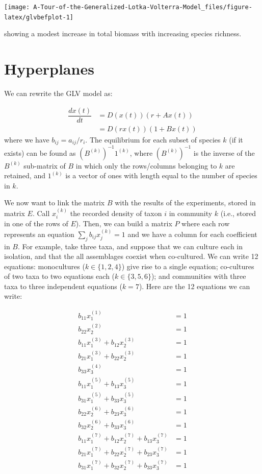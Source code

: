 \documentclass[]{book}
\begin{document}
\begin{center}\texttt{[image: A-Tour-of-the-Generalized-Lotka-Volterra-Model\_files/figure-latex/glvbefplot-1]} \end{center}

showing a modest increase in total biomass with increasing species richness.

\hypertarget{hyperplanes}{%
\section{Hyperplanes}\label{hyperplanes}}

We can rewrite the GLV model as:

\[
\begin{aligned}
\dfrac{dx(t)}{dt} &= D(x(t))(r + A x(t))\\
&= D(r x(t))(1 + B x(t))
\end{aligned}
\]
where we have \(b_{ij} = a_{ij} / r_i\). The equilibrium for each subset of species \(k\) (if it exists) can be found as \((B^{(k)})^{-1} 1^{(k)}\), where \((B^{(k)})^{-1}\) is the inverse of the \(B^{(k)}\) sub-matrix of \(B\) in which only the rows/columns belonging to \(k\) are retained, and \(1^{(k)}\) is a vector of ones with length equal to the number of species in \(k\).

We now want to link the matrix \(B\) with the results of the experiments, stored in matrix \(E\). Call \(x^{(k)}_i\) the recorded density of taxon \(i\) in community \(k\) (i.e., stored in one of the rows of \(E\)). Then, we can build a matrix \(P\) where each row represents an equation \(\sum_j b_{ij} x_j^{(k)} = 1\) and we have a column for each coefficient in \(B\). For example, take three taxa, and suppose that we can culture each in isolation, and that the all assemblages coexist when co-cultured. We can write 12 equations: monocultures (\(k \in \{1, 2, 4\}\)) give rise to a single equation; co-cultures of two taxa to two equations each (\(k \in \{3, 5, 6 \}\)); and communities with three taxa to three independent equations (\(k = 7\)). Here are the 12 equations we can write:

\[
\begin{aligned}
b_{11} x_1^{(1)} &= 1\\
b_{22} x_2^{(2)} &= 1\\
b_{11} x_1^{(3)} + b_{12}x_2^{(3)} &= 1\\
b_{21} x_1^{(3)} + b_{22}x_2^{(3)} &= 1\\
b_{33} x_3^{(4)} &= 1\\
b_{11} x_1^{(5)} + b_{13} x_3^{(5)} &= 1\\
b_{31} x_1^{(5)} + b_{33} x_3^{(5)} &= 1\\
b_{22} x_2^{(6)} + b_{23} x_3^{(6)} &= 1\\
b_{32} x_2^{(6)} + b_{33} x_3^{(6)} &= 1\\
b_{11} x_1^{(7)} + b_{12} x_2^{(7)} + b_{13} x_3^{(7)} & = 1\\
b_{21} x_1^{(7)} + b_{22} x_2^{(7)} + b_{23} x_3^{(7)} & = 1\\
b_{31} x_1^{(7)} + b_{32} x_2^{(7)} + b_{33} x_3^{(7)} & = 1
\end{aligned}
\]
\end{document}
